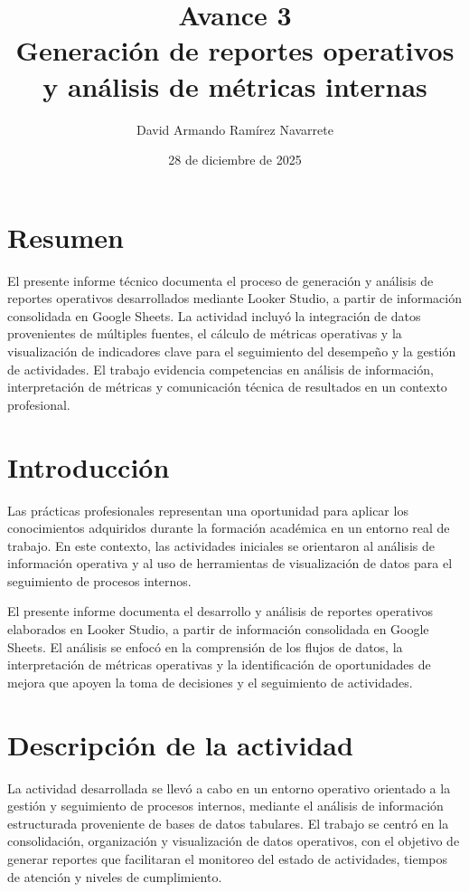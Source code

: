 \documentclass[12pt]{article}
\title{Avance 3 \\ Generación de reportes operativos y análisis de métricas internas}
\author{David Armando Ramírez Navarrete}
\date{28 de diciembre de 2025}
\begin{document}
\maketitle

\section*{Resumen}
El presente informe técnico documenta el proceso de generación y análisis de reportes operativos desarrollados mediante Looker Studio, a partir de información consolidada en Google Sheets. La actividad incluyó la integración de datos provenientes de múltiples fuentes, el cálculo de métricas operativas y la visualización de indicadores clave para el seguimiento del desempeño y la gestión de actividades. El trabajo evidencia competencias en análisis de información, interpretación de métricas y comunicación técnica de resultados en un contexto profesional.


\section*{Introducción}
Las prácticas profesionales representan una oportunidad para aplicar los conocimientos adquiridos durante la formación académica en un entorno real de trabajo. En este contexto, las actividades iniciales se orientaron al análisis de información operativa y al uso de herramientas de visualización de datos para el seguimiento de procesos internos.

El presente informe documenta el desarrollo y análisis de reportes operativos elaborados en Looker Studio, a partir de información consolidada en Google Sheets. El análisis se enfocó en la comprensión de los flujos de datos, la interpretación de métricas operativas y la identificación de oportunidades de mejora que apoyen la toma de decisiones y el seguimiento de actividades.


\section*{Descripción de la actividad}
La actividad desarrollada se llevó a cabo en un entorno operativo orientado a la gestión y seguimiento de procesos internos, mediante el análisis de información estructurada proveniente de bases de datos tabulares. El trabajo se centró en la consolidación, organización y visualización de datos operativos, con el objetivo de generar reportes que facilitaran el monitoreo del estado de actividades, tiempos de atención y niveles de cumplimiento.
\end{document}
